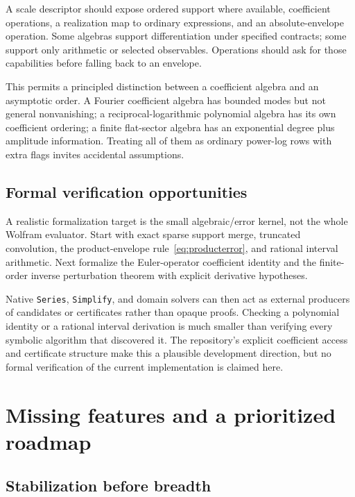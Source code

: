 A scale descriptor should expose ordered support where available, coefficient operations, a realization map to ordinary expressions, and an absolute-envelope operation. Some algebras support differentiation under specified contracts; some support only arithmetic or selected observables. Operations should ask for those capabilities before falling back to an envelope.

This permits a principled distinction between a coefficient algebra and an asymptotic order. A Fourier coefficient algebra has bounded modes but not general nonvanishing; a reciprocal-logarithmic polynomial algebra has its own coefficient ordering; a finite flat-sector algebra has an exponential degree plus amplitude information. Treating all of them as ordinary power-log rows with extra flags invites accidental assumptions.

\subsection{Formal verification opportunities}

A realistic formalization target is the small algebraic/error kernel, not the whole Wolfram evaluator. Start with exact sparse support merge, truncated convolution, the product-envelope rule~\eqref{eq:producterror}, and rational interval arithmetic. Next formalize the Euler-operator coefficient identity and the finite-order inverse perturbation theorem with explicit derivative hypotheses.

Native \texttt{Series}, \texttt{Simplify}, and domain solvers can then act as external producers of candidates or certificates rather than opaque proofs. Checking a polynomial identity or a rational interval derivation is much smaller than verifying every symbolic algorithm that discovered it. The repository's explicit coefficient access and certificate structure make this a plausible development direction, but no formal verification of the current implementation is claimed here.

\section{Missing features and a prioritized roadmap}
\label{sec:roadmap}

\subsection{Stabilization before breadth}

